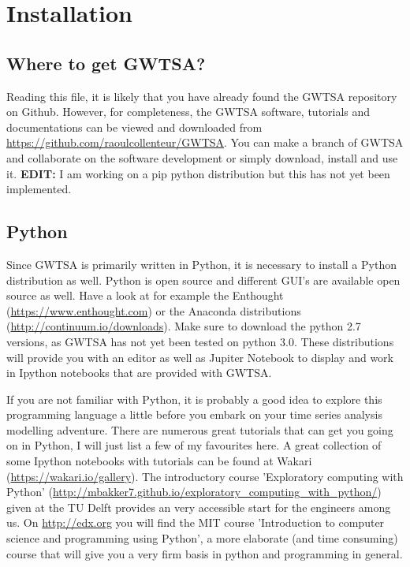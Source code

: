 \chapter{Installation}

\section{Where to get GWTSA?}
Reading this file, it is likely that you have already found the GWTSA repository on Github. However, for completeness, the GWTSA software, tutorials and documentations can be viewed and downloaded from \url{https://github.com/raoulcollenteur/GWTSA}. You can make a branch of GWTSA and collaborate on the software development or simply download, install and use it. \textbf{EDIT:} I am working on a pip python distribution but this has not yet been implemented.

\section{Python}
Since GWTSA is primarily written in Python, it is necessary to install a Python distribution as well. Python is open source and different GUI's are available open source as well. Have a look at for example the Enthought (\url{https://www.enthought.com}) or the Anaconda distributions (\url{http://continuum.io/downloads}). Make sure to download the python 2.7 versions, as GWTSA has not yet been tested on python 3.0. These distributions will provide you with an editor as well as Jupiter Notebook to display and work in Ipython notebooks that are provided with GWTSA.

If you are not familiar with Python, it is probably a good idea to explore this programming language a little before you embark on your time series analysis modelling adventure. There are numerous great tutorials that can get you going on in Python, I will just list a few of my favourites here. A great collection of some Ipython notebooks with tutorials can be found at Wakari (\url{https://wakari.io/gallery}). The introductory course 'Exploratory computing with Python' (\url{http://mbakker7.github.io/exploratory_computing_with_python/}) given at the TU Delft provides an very accessible start for the engineers among us. On \url{http://edx.org} you will find the MIT course 'Introduction to computer science and programming using Python', a more elaborate (and time consuming) course that will give you a very firm basis in python and programming in general.   

